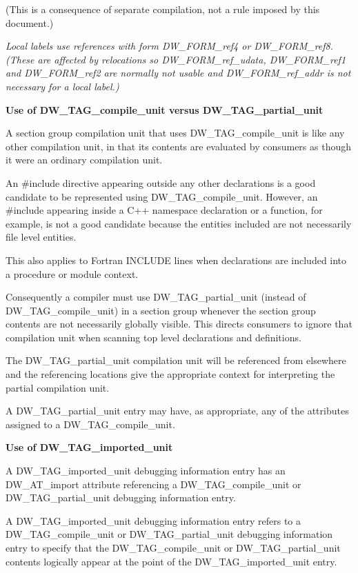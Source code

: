 (This is a consequence of separate compilation, not a rule
imposed by this document.)

\textit{Local labels use references with form DW\_FORM\_ref4
or 
DW\_FORM\_ref8. 
(These are affected by relocations
so 
DW\_FORM\_ref\_udata, 
DW\_FORM\_ref1 and 
DW\_FORM\_ref2 are
normally not usable and 
DW\_FORM\_ref\_addr is not necessary
for a local label.)}

\textbf{Use of DW\_TAG\_compile\_unit versus 
DW\_TAG\_partial\_unit}

A section group compilation unit that uses 
DW\_TAG\_compile\_unit
is like any other compilation unit, in that its contents
are evaluated by consumers as though it were an ordinary
compilation unit.

An \#include directive appearing outside any other
declarations is a good candidate to be represented using
DW\_TAG\_compile\_unit. 
However, an \#include appearing inside
a C++ namespace declaration or a function, for example, is
not a good candidate because the entities included are not
necessarily file level entities.

This also applies to Fortran INCLUDE lines when declarations
are included into a procedure or module context.

Consequently a compiler must use DW\_TAG\_partial\_unit (instead
of DW\_TAG\_compile\_unit) in a section group whenever the section
group contents are not necessarily globally visible. This
directs consumers to ignore that compilation unit when scanning
top level declarations and definitions.

The DW\_TAG\_partial\_unit compilation unit will be referenced
from elsewhere and the referencing locations give the
appropriate context for interpreting the partial compilation
unit.

A DW\_TAG\_partial\_unit entry may have, as appropriate, any of
the attributes assigned to a DW\_TAG\_compile\_unit.


\textbf{Use of DW\_TAG\_imported\_unit}

A DW\_TAG\_imported\_unit debugging information entry has an
DW\_AT\_import attribute referencing a DW\_TAG\_compile\_unit or
DW\_TAG\_partial\_unit debugging information entry.

A DW\_TAG\_imported\_unit debugging information entry refers
to a 
DW\_TAG\_compile\_unit or 
DW\_TAG\_partial\_unit debugging
information entry to specify that the 
DW\_TAG\_compile\_unit or
DW\_TAG\_partial\_unit contents logically appear at the point
of the 
DW\_TAG\_imported\_unit entry.


